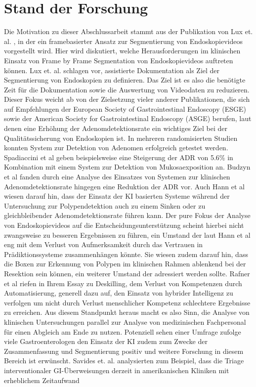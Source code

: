 \chapter{Stand der Forschung}\label{ch:relatedWork}

Die Motivation zu dieser Abschlussarbeit stammt aus der Publikation von Lux et. al. \cite{lux-2023}, in der ein framebasierter Ansatz zur Segmentierung von Endoskopievideos vorgestellt wird. Hier wird diskutiert, welche Herausforderungen im klinischen Einsatz von Frame by Frame Segmentation von Endoskopievideos auftreten können. Lux et. al. schlagen vor, assistierte Dokumentation als Ziel der Segmentierung von Endoskopien zu definieren. Das Ziel ist es also die benötigte Zeit für die Dokumentation sowie die Auswertung von Videodaten zu reduzieren. Dieser Fokus weicht ab von der Zielsetzung vieler anderer Publikationen, die sich auf Empfehlungen der European Society of Gastrointestinal Endoscopy (ESGE) sowie der American Society for Gastrointestinal Endoscopy (ASGE) berufen, laut denen eine Erhöhung der Adenomdetektionsrate ein wichtiges Ziel bei der Qualitätssicherung von Endoskopien ist. \cite{Rex_2022}\cite{kaminski-performance-2017} In mehreren randomisierten Studien konnten System zur Detektion von Adenomen erfolgreich getestet werden. Spadiaccini et al geben beispielsweise eine Steigerung der ADR von 5.6\% in Kombination mit einem System zur Detektion von Mukosaexposition an. \cite{SPADACCINI2023244} Budzyn et al fanden durch eine Analyse des Einsatzes von Systemen zur klinischen Adenomdetektionsrate hingegen eine Reduktion der ADR vor. \cite{budzyn2025deskilling} Auch Hann et al wiesen darauf hin, dass der Einsatz der KI basierten Systeme während der Untersuchung zur Polypendetektion auch zu einem Sinken oder zu gleichbleibender Adenomdetektionsrate führen kann. \cite{hann_entscheidungsunterstutzung_2025}  Der pure Fokus der Analyse von Endoskopievideos auf die Entscheidungsunterstützung scheint hierbei nicht zwangsweise zu besseren Ergebnissen zu führen, ein Umstand der laut Hann et al eng mit dem Verlust von Aufmerksamkeit durch das Vertrauen in Prädiktionssysteme zusammenhängen könnte. Sie wiesen zudem darauf hin, dass die Boxen zur Erkennung von Polypen im klinischen Rahmen ablenkend bei der Resektion sein können, ein weiterer Umstand der adressiert werden sollte. Rafner et al riefen in Ihrem Essay zu Deskilling, dem Verlust von Kompetenzen durch Automatisierung, generell dazu auf, den Einsatz von hybrider Intelligenz zu verfolgen um nicht durch Verlust menschlicher Kompetenz schlechtere Ergebnisse zu erreichen. \cite{rafner_2025_deskilling} Aus diesem Standpunkt heraus macht es also Sinn, die Analyse von klinischen Untersuchungen parallel zur Analyse von medizinischen Fachpersonal für einen Abgleich am Ende zu nutzen. Potenziell sehen einer Umfrage zufolge viele Gastroenterologen den Einsatz der KI zudem zum Zwecke der Zusammenfassung und Segmentierung positiv und weitere Forschung in diesem Bereich ist erwünscht. \cite{munzer_content-based_2018} Savides et. al. analysierten zum Beispiel, dass die Triage interventionaler GI-Überweisungen derzeit in amerikanischen Kliniken mit erheblichem Zeitaufwand 